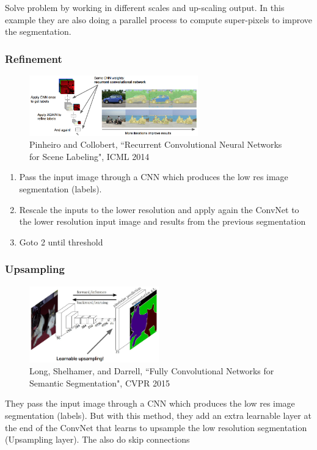 Solve problem by working in different scales and up-scaling output. In this example they are also doing a parallel process to compute super-pixels to improve the segmentation.



\subsubsection*{Refinement}
\begin{figure}[h]
  \centering
  \includegraphics[width=0.65\textwidth]{Images/applications/17.png}
  \caption{Pinheiro and Collobert, ``Recurrent Convolutional Neural Networks for Scene Labeling", ICML 2014}
\end{figure}

\begin{enumerate}
\item Pass the input image through a CNN which produces the low res image segmentation (labels).
\item Rescale the inputs to the lower resolution and apply again the ConvNet to the lower resolution input image and results from the previous segmentation
\item Goto 2 until threshold
\end{enumerate}



\subsubsection*{Upsampling}
\begin{figure}[h]
  \centering
  \includegraphics[width=0.5\textwidth]{Images/applications/18.png}
  \caption{Long, Shelhamer, and Darrell, ``Fully Convolutional Networks for Semantic Segmentation", CVPR 2015}
\end{figure}
They pass the input image through a CNN which produces the low res image segmentation (labels). But with this method, they add an extra learnable layer at the end of the ConvNet that learns to upsample the low resolution segmentation (Upsampling layer). The also do skip connections



